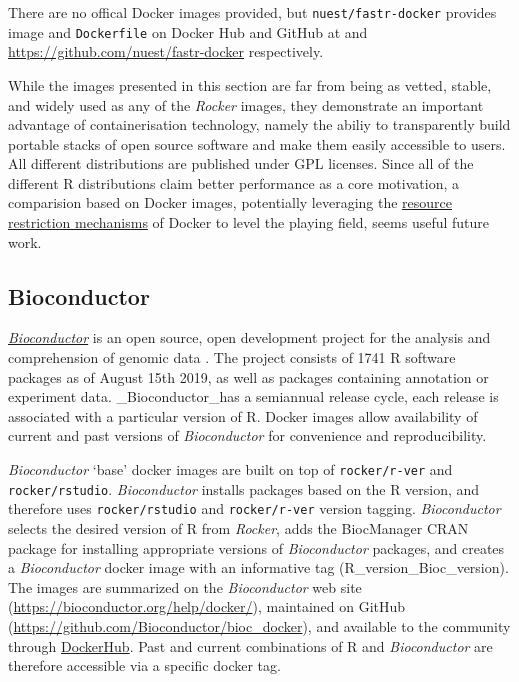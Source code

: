 There are no offical Docker images provided, but
\texttt{nuest/fastr-docker} provides image and \texttt{Dockerfile} on
Docker Hub and GitHub at \href{}{} and
\url{https://github.com/nuest/fastr-docker} respectively.

While the images presented in this section are far from being as vetted,
stable, and widely used as any of the \emph{Rocker} images, they
demonstrate an important advantage of containerisation technology,
namely the abiliy to transparently build portable stacks of open source
software and make them easily accessible to users. All different
distributions are published under GPL licenses. Since all of the
different R distributions claim better performance as a core motivation,
a comparision based on Docker images, potentially leveraging the
\href{https://docs.docker.com/config/containers/resource_constraints/}{resource
restriction mechanisms} of Docker to level the playing field, seems
useful future work.

\hypertarget{bioconductor}{%
\subsection{Bioconductor}\label{bioconductor}}

\href{http://bioconductor.org/help/docker/}{\emph{Bioconductor}} is an
open source, open development project for the analysis and comprehension
of genomic data \citep{gentleman_bioconductor_2004}. The project
consists of 1741 R software packages as of August 15th 2019, as well as
packages containing annotation or experiment data. \_Bioconductor\_has a
semiannual release cycle, each release is associated with a particular
version of R. Docker images allow availability of current and past
versions of \emph{Bioconductor} for convenience and reproducibility.

\emph{Bioconductor} `base' docker images are built on top of
\texttt{rocker/r-ver} and \texttt{rocker/rstudio}. \emph{Bioconductor}
installs packages based on the R version, and therefore uses
\texttt{rocker/rstudio} and \texttt{rocker/r-ver} version tagging.
\emph{Bioconductor} selects the desired version of R from \emph{Rocker},
adds the BiocManager CRAN package for installing appropriate versions of
\emph{Bioconductor} packages, and creates a \emph{Bioconductor} docker
image with an informative tag (R\_version\_Bioc\_version). The images
are summarized on the \emph{Bioconductor} web site
(\url{https://bioconductor.org/help/docker/}), maintained on GitHub
(\url{https://github.com/Bioconductor/bioc_docker}), and available to
the community through \href{https://hub.docker.com/}{DockerHub}. Past
and current combinations of R and \emph{Bioconductor} are therefore
accessible via a specific docker tag.

